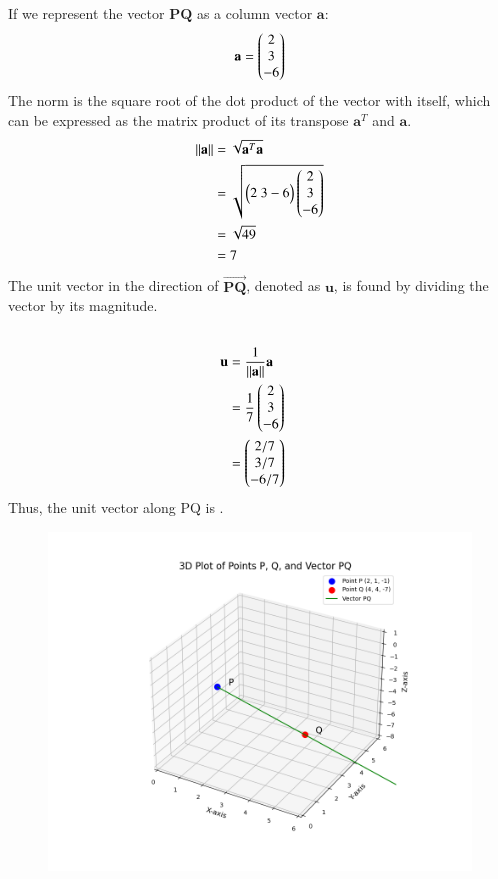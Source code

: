 \documentclass[journal]{IEEEtran}
\begin{document}
If we represent the vector \(\mathbf{PQ}\) as a column vector \(\mathbf{a}\):
\[
\mathbf{a} = 
\myvec{2\\3\\-6}
\]
The norm is the square root of the dot product of the vector with itself, which can be expressed as the matrix product of its transpose \(\mathbf{a}^T\) and \(\mathbf{a}\).
\begin{align}
    \left\| \mathbf{a} \right\| &= \sqrt{\mathbf{a}^T \mathbf{a}} \\
    &= \sqrt{
        \myvec{2\ 3-6}
        \myvec{2\\3\\-6}
    } \\
    &= \sqrt{49} \\
    &= 7
\end{align}
The unit vector in the direction of $\vec{\mathbf{PQ}}$, denoted as $\mathbf{u}$, is found by dividing the vector by its magnitude.
\begin{align}
     \\
     \mathbf{u} &= \frac{1}{\left\| \mathbf{a} \right\|} \mathbf{a} \\
    &= \frac{1}{7} 
    \myvec{2\\3\\-6} \\
    &= 
    \myvec{2/7\\3/7\\-6/7}
\end{align}
Thus, the unit vector along PQ is  .
\begin{figure}[H]
\begin{center}
\includegraphics[width=0.63\columnwidth]{figs/fig1.png}
\end{center}
\caption{}
\label{fig:Fig.1}
\end{figure}
\end{document}
